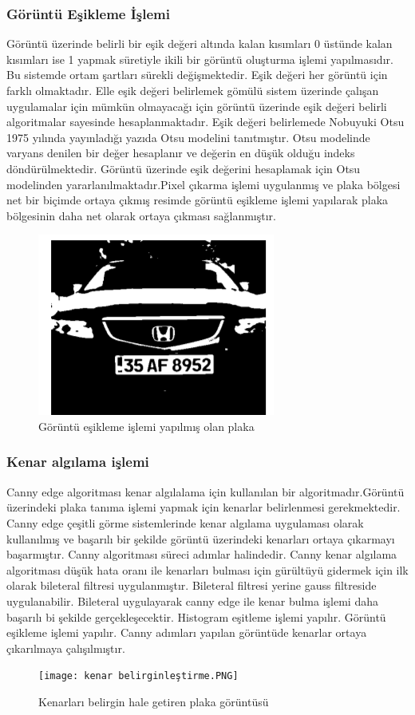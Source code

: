 \subsubsection{Görüntü Eşikleme İşlemi}
\cite{shape}
Görüntü üzerinde belirli bir eşik değeri altında kalan kısımları 0 üstünde kalan kısımları ise 1 yapmak süretiyle ikili bir görüntü oluşturma işlemi yapılmasıdır. Bu sistemde ortam şartları sürekli değişmektedir. Eşik değeri her görüntü için farklı olmaktadır. Elle eşik değeri belirlemek gömülü sistem üzerinde çalışan uygulamalar için mümkün olmayacağı için görüntü üzerinde eşik değeri belirli algoritmalar sayesinde hesaplanmaktadır. Eşik değeri belirlemede Nobuyuki Otsu 1975 yılında yayınladığı yazıda Otsu modelini tanıtmıştır. Otsu modelinde varyans denilen bir değer hesaplanır ve değerin en düşük olduğu indeks döndürülmektedir. Görüntü üzerinde eşik değerini hesaplamak için Otsu modelinden yararlanılmaktadır.Pixel çıkarma işlemi uygulanmış ve plaka bölgesi net bir biçimde ortaya çıkmış resimde görüntü eşikleme işlemi yapılarak plaka bölgesinin daha net olarak ortaya çıkması sağlanmıştır.
\begin{figure}
    \centering
    \includegraphics{görüntü eşikleme.PNG}
    \caption{Görüntü eşikleme işlemi yapılmış olan plaka}
    \label{fig:my_label}
\end{figure}
\subsubsection{Kenar algılama işlemi}
\cite{skeletonization} Canny edge algoritması kenar algılalama için kullanılan bir algoritmadır.Görüntü üzerindeki plaka tanıma işlemi yapmak için kenarlar belirlenmesi gerekmektedir. Canny edge çeşitli görme sistemlerinde kenar algılama uygulaması olarak kullanılmış ve başarılı bir şekilde görüntü üzerindeki kenarları ortaya çıkarmayı başarmıştır. Canny algoritması süreci adımlar halindedir. Canny kenar algılama algoritması düşük hata oranı ile kenarları bulması için gürültüyü gidermek için ilk olarak bileteral filtresi uygulanmıştır. Bileteral filtresi yerine gauss filtreside uygulanabilir. Bileteral uygulayarak canny edge ile kenar bulma işlemi daha başarılı bi şekilde gerçekleşecektir. Histogram eşitleme işlemi yapılır. Görüntü eşikleme işlemi yapılır. Canny adımları yapılan görüntüde kenarlar ortaya çıkarılmaya çalışılmıştır.
\begin{figure}
    \centering
    \texttt{[image: kenar belirginleştirme.PNG]}
    \caption{Kenarları belirgin hale getiren plaka görüntüsü}
    \label{fig:my_label}
\end{figure}
